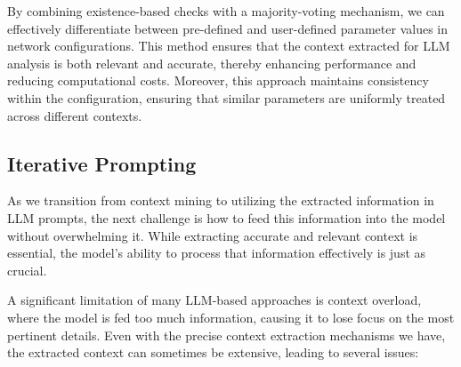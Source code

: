 By combining existence-based checks with a majority-voting mechanism, we can effectively differentiate between pre-defined and user-defined parameter values in network configurations. This method ensures that the context extracted for LLM analysis is both relevant and accurate, thereby enhancing performance and reducing computational costs. Moreover, this approach maintains consistency within the configuration, ensuring that similar parameters are uniformly treated across different contexts.


\subsection{Iterative Prompting}\label{prompting_method}
As we transition from context mining to utilizing the extracted information in LLM prompts, the next challenge is how to feed this information into the model without overwhelming it. While extracting accurate and relevant context is essential, the model's ability to process that information effectively is just as crucial.


\label{challenge_3}
A significant limitation of many LLM-based approaches is context overload, where the model is fed too much information, causing it to lose focus on the most pertinent details.
Even with the precise context extraction mechanisms we have, the extracted context can sometimes be extensive,
leading to several issues:


